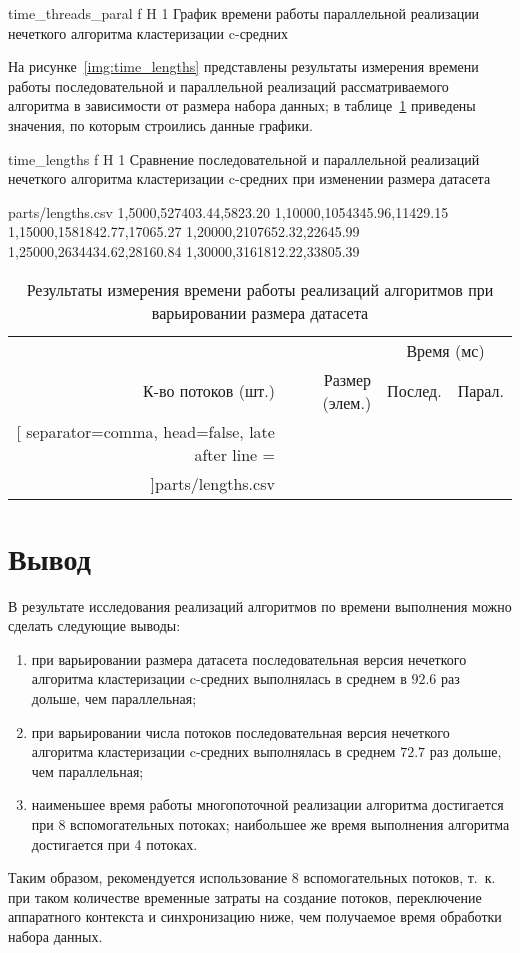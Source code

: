 	{time_threads_paral}
	{f}
	{H}
	{1\textwidth}
	{График времени работы параллельной реализации нечеткого алгоритма кластеризации c-средних}
	
На рисунке~\ref{img:time_lengths} представлены результаты измерения времени работы последовательной и параллельной реализаций рассматриваемого алгоритма в зависимости от размера набора данных; в таблице~\ref{tbl:time_lengths} приведены значения, по которым строились данные графики.

	{time_lengths}
	{f}
	{H}
	{1\textwidth}
	{Сравнение последовательной и параллельной реализаций нечеткого алгоритма кластеризации c-средних при изменении размера датасета}

\begin{filecontents*}{parts/lengths.csv}
	1,5000,527403.44,5823.20
	1,10000,1054345.96,11429.15
	1,15000,1581842.77,17065.27
	1,20000,2107652.32,22645.99
	1,25000,2634434.62,28160.84
	1,30000,3161812.22,33805.39
\end{filecontents*}

\begin{table}[H]
	\centering
	\caption{Результаты измерения времени работы реализаций алгоритмов при варьировании размера датасета}
	\label{tbl:time_lengths}
	\begin{tabular}{|r|r|r|r|}
		\hline
		~ & ~ & \multicolumn{2}{c|}{Время (мс)} \\
		\cline{3-4}
		К-во потоков (шт.) & Размер (элем.) & Послед{.} & Парал{.} \\ \hline
		\csvreader[
			separator=comma,
			head=false,
			late after line = \\\hline
		]{parts/lengths.csv}{}{%
			\csvcoli & \csvcolii & \csvcoliii & \csvcoliv 
		}
	\end{tabular}
\end{table}

\section{Вывод}

В результате исследования реализаций алгоритмов по времени выполнения можно сделать следующие выводы:
\begin{enumerate}
	\item при варьировании размера датасета последовательная версия нечеткого алгоритма кластеризации c-средних выполнялась в среднем в $92.6$ раз дольше, чем параллельная; 
	\item при варьировании числа потоков последовательная версия нечеткого алгоритма кластеризации c-средних выполнялась в среднем $72.7$ раз дольше, чем параллельная;
	\item наименьшее время работы многопоточной реализации алгоритма достигается при 8 вспомогательных потоках; наибольшее же время выполнения алгоритма достигается при 4 потоках.
\end{enumerate}
Таким образом, рекомендуется использование 8 вспомогательных потоков, т.~к. при таком количестве временные затраты на создание потоков, переключение аппаратного контекста и синхронизацию ниже, чем получаемое время обработки набора данных.
